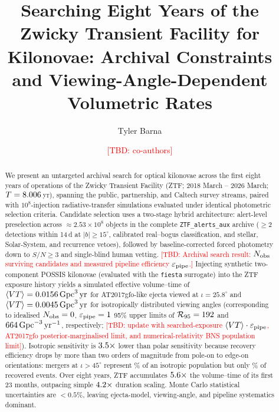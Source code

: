 \documentclass[twocolumn]{aastex631}
\newcommand{\tbd}[1]{\textcolor{red}{[TBD: #1]}}
\newcommand{\rlim}{\mathcal{R}_{95}}
\newcommand{\vteff}{\langle VT\rangle}
\newcommand{\epspipe}{\varepsilon_{\rm pipe}}
\newcommand{\gpcyr}{\mathrm{Gpc}^{-3}\,\mathrm{yr}^{-1}}
\newcommand{\gpcvolyr}{\mathrm{Gpc}^{3}\,\mathrm{yr}}
\begin{document}
\title{Searching Eight Years of the Zwicky Transient Facility for Kilonovae: Archival Constraints and Viewing-Angle-Dependent Volumetric Rates}

\author[0000-0002-0000-0000]{Tyler Barna}

\author{\tbd{co-authors}}

\begin{abstract}
We present an untargeted archival search for optical kilonovae across the first eight years of operations of the Zwicky Transient Facility (ZTF; 2018 March -- 2026 March; $T = 8.006$\,yr), spanning the public, partnership, and Caltech survey streams, paired with $10^8$-injection radiative-transfer simulations evaluated under identical photometric selection criteria. Candidate selection uses a two-stage hybrid architecture: alert-level preselection across $\approx 2.53\times 10^8$ objects in the complete \texttt{ZTF\_alerts\_aux} archive ($\ge 2$ detections within 14\,d at $|b| \ge 15^\circ$, calibrated real--bogus classification, and stellar, Solar-System, and recurrence vetoes), followed by baseline-corrected forced photometry down to $S/N \ge 3$ and single-blind human vetting. \tbd{Archival search result: $N_{\rm obs}$ surviving candidates and measured pipeline efficiency $\epspipe$.} Injecting synthetic two-component POSSIS kilonovae (evaluated with the \texttt{fiesta} surrogate) into the ZTF exposure history yields a simulated effective volume--time of $\vteff = \VTPolar\,\gpcvolyr$ for AT2017gfo-like ejecta viewed at $\iota = 25.8^\circ$ and $\vteff = \VTIsotropic\,\gpcvolyr$ for isotropically distributed viewing angles (corresponding to idealised $N_{\rm obs}=0$, $\epspipe=1$ 95\% upper limits of $\rlim = \RlimPolarIdeal$ and $\RlimIsotropicIdeal\,\gpcyr$, respectively; \tbd{update with searched-exposure $\vteff \cdot \epspipe$, AT2017gfo posterior-marginalised limit, and numerical-relativity BNS population limit}). Isotropic sensitivity is $3.5\times$ lower than polar sensitivity because recovery efficiency drops by more than two orders of magnitude from pole-on to edge-on orientations: mergers at $\iota > 45^\circ$ represent \IsoPopGtFortyFivePct\% of an isotropic population but only \IsoRecGtFortyFivePct\% of recovered events. Over eight years, ZTF accumulates $5.6\times$ the volume--time of its first 23 months, outpacing simple $4.2\times$ duration scaling. Monte Carlo statistical uncertainties are $<0.5\%$, leaving ejecta-model, viewing-angle, and pipeline systematics dominant.
\end{abstract}
\end{document}
